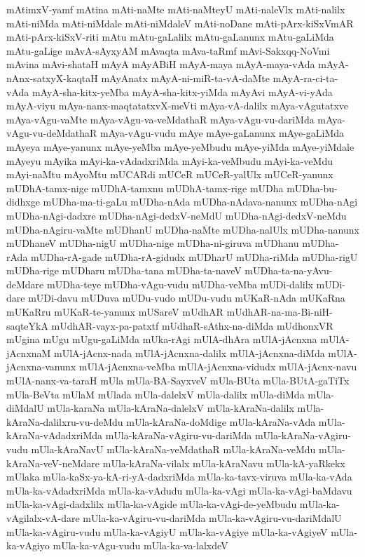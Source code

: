 {mAtimxV-yamf
mAtina
mAti-naMte
mAti-naMteyU
mAti-naleVlx
mAti-nalilx
mAti-niMda
mAti-niMdale
mAti-niMdaleV
mAti-noDane
mAti-pArx-kiSxVmAR
mAti-pArx-kiSxV-riti
mAtu
mAtu-gaLalilx
mAtu-gaLanunx
mAtu-gaLiMda
mAtu-gaLige
mAvA-sAyxyAM
mAvaqta
mAva-taRmf
mAvi-Sakxqq-NoVmi
mAvina
mAvi-shataH
mAyA
mAyABiH
mAyA-maya
mAyA-maya-vAda
mAyA-nAnx-satxyX-kaqtaH
mAyAnatx
mAyA-ni-miR-ta-vA-daMte
mAyA-ra-ci-ta-vAda
mAyA-sha-kitx-yeMba
mAyA-sha-kitx-yiMda
mAyAvi
mAyA-vi-yAda
mAyA-viyu
mAya-nanx-maqtatatxvX-meVti
mAya-vA-dalilx
mAya-vAgutatxve
mAya-vAgu-vaMte
mAya-vAgu-va-veMdathaR
mAya-vAgu-vu-dariMda
mAya-vAgu-vu-deMdathaR
mAya-vAgu-vudu
mAye
mAye-gaLanunx
mAye-gaLiMda
mAyeya
mAye-yanunx
mAye-yeMba
mAye-yeMbudu
mAye-yiMda
mAye-yiMdale
mAyeyu
mAyika
mAyi-ka-vAdadxriMda
mAyi-ka-veMbudu
mAyi-ka-veMdu
mAyi-naMtu
mAyoMtu
mUCARdi
mUCeR
mUCeR-yalUlx
mUCeR-yanunx
mUDhA-tamx-nige
mUDhA-tamxnu
mUDhA-tamx-rige
mUDha
mUDha-bu-didhxge
mUDha-ma-ti-gaLu
mUDha-nAda
mUDha-nAdava-nanunx
mUDha-nAgi
mUDha-nAgi-dadxre
mUDha-nAgi-dedxV-neMdU
mUDha-nAgi-dedxV-neMdu
mUDha-nAgiru-vaMte
mUDhanU
mUDha-naMte
mUDha-nalUlx
mUDha-nanunx
mUDhaneV
mUDha-nigU
mUDha-nige
mUDha-ni-giruva
mUDhanu
mUDha-rAda
mUDha-rA-gade
mUDha-rA-gidudx
mUDharU
mUDha-riMda
mUDha-rigU
mUDha-rige
mUDharu
mUDha-tana
mUDha-ta-naveV
mUDha-ta-na-yAvu-deMdare
mUDha-teye
mUDha-vAgu-vudu
mUDha-veMba
mUDi-dalilx
mUDi-dare
mUDi-davu
mUDuva
mUDu-vudo
mUDu-vudu
mUKaR-nAda
mUKaRna
mUKaRru
mUKaR-te-yanunx
mUSareV
mUdhAR
mUdhAR-na-ma-Bi-niH-saqteYkA
mUdhAR-vayx-pa-patxtf
mUdhaR-sAthx-na-diMda
mUdhonxVR
mUgina
mUgu
mUgu-gaLiMda
mUka-rAgi
mUlA-dhAra
mUlA-jAcnxna
mUlA-jAcnxnaM
mUlA-jAcnx-nada
mUlA-jAcnxna-dalilx
mUlA-jAcnxna-diMda
mUlA-jAcnxna-vanunx
mUlA-jAcnxna-veMba
mUlA-jAcnxna-vidudx
mUlA-jAcnx-navu
mUlA-nanx-va-taraH
mUla
mUla-BA-SayxveV
mUla-BUta
mUla-BUtA-gaTiTx
mUla-BeVta
mUlaM
mUlada
mUla-dalelxV
mUla-dalilx
mUla-diMda
mUla-diMdalU
mUla-karaNa
mUla-kAraNa-dalelxV
mUla-kAraNa-dalilx
mUla-kAraNa-dalilxru-vu-deMdu
mUla-kAraNa-doMdige
mUla-kAraNa-vAda
mUla-kAraNa-vAdadxriMda
mUla-kAraNa-vAgiru-vu-dariMda
mUla-kAraNa-vAgiru-vudu
mUla-kAraNavU
mUla-kAraNa-veMdathaR
mUla-kAraNa-veMdu
mUla-kAraNa-veV-neMdare
mUla-kAraNa-vilalx
mUla-kAraNavu
mUla-kA-yaRkekx
mUlaka
mUla-kaSx-ya-kA-ri-yA-dadxriMda
mUla-ka-tavx-viruva
mUla-ka-vAda
mUla-ka-vAdadxriMda
mUla-ka-vAdudu
mUla-ka-vAgi
mUla-ka-vAgi-baMdavu
mUla-ka-vAgi-dadxlilx
mUla-ka-vAgide
mUla-ka-vAgi-de-yeMbudu
mUla-ka-vAgilalx-vA-dare
mUla-ka-vAgiru-vu-dariMda
mUla-ka-vAgiru-vu-dariMdalU
mUla-ka-vAgiru-vudu
mUla-ka-vAgiyU
mUla-ka-vAgiye
mUla-ka-vAgiyeV
mUla-ka-vAgiyo
mUla-ka-vAgu-vudu
mUla-ka-va-lalxdeV
}
